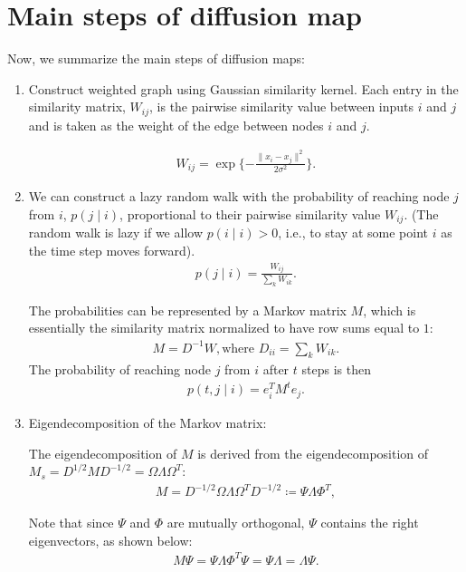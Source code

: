 \section{Main steps of diffusion map}
Now, we summarize the main steps of diffusion maps:
\begin{enumerate}
    \item Construct weighted graph using Gaussian similarity kernel. Each entry in the similarity matrix, $W_{i j}$, is the pairwise similarity value between inputs $i$ and $j$ and is taken as the weight of the edge between nodes $i$ and $j$. 
    
    \begin{align}
        W_{i j } = \exp\{-\frac{\|x_i - x_j\|^2}{2\sigma^2}\}.
    \end{align}
    
    \item We can construct a lazy random walk with the probability of reaching node $j$ from $i$, $p(j \mid i)$, proportional to their pairwise similarity value $W_{i j}$. (The random walk is lazy if we allow $p(i\mid i) > 0$, i.e., to stay at some point $i$ as the time step moves forward). 
    \begin{align}
        p(j\mid i) = \frac{W_{i j}}{\sum_{k} W_{i k}}.
    \end{align}
    
    The probabilities can be represented by a Markov matrix $M$, which is essentially the similarity matrix normalized to have row sums equal to $1$:
     \begin{align}
        M = D^{-1} W, \text{where } D_{i i} =\sum_{k}W_{i k}.
    \end{align}
    The probability of reaching node $j$ from $i$ after $t$ steps is then
    \begin{align}
        p(t,j\mid i) = e_i^T M^t e_j.
    \end{align}

    \item Eigendecomposition of the Markov matrix:
    
    The eigendecomposition of $M$ is derived from the eigendecomposition of $M_s = D^{1/2} M D^{-1/2} = \Omega \Lambda \Omega^T$:
    \begin{align}
        M = D^{-1/2}  \Omega \Lambda \Omega^T D^{-1/2} \coloneqq \Psi \Lambda \Phi^T,
    \end{align}
    
    Note that since $\Psi$ and $\Phi$ are mutually orthogonal, $\Psi$ contains the right eigenvectors, as shown below:
     \begin{align}
        M \Psi =  \Psi \Lambda \Phi^T \Psi = \Psi \Lambda =  \Lambda \Psi.
    \end{align}
    

\end{enumerate}
